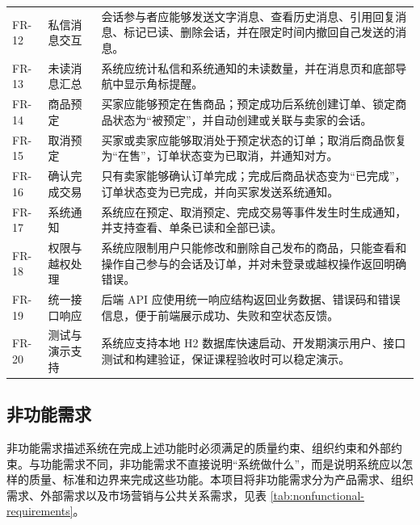 ﻿\documentclass[UTF8,a4paper,12pt]{ctexart}
\begin{document}
\begin{longtable}{p{2.2cm}p{3.6cm}p{7.8cm}}
  FR-12 & 私信消息交互 & 会话参与者应能够发送文字消息、查看历史消息、引用回复消息、标记已读、删除会话，并在限定时间内撤回自己发送的消息。 \\
  FR-13 & 未读消息汇总 & 系统应统计私信和系统通知的未读数量，并在消息页和底部导航中显示角标提醒。 \\
  FR-14 & 商品预定 & 买家应能够预定在售商品；预定成功后系统创建订单、锁定商品状态为“被预定”，并自动创建或关联与卖家的会话。 \\
  FR-15 & 取消预定 & 买家或卖家应能够取消处于预定状态的订单；取消后商品恢复为“在售”，订单状态变为已取消，并通知对方。 \\
  FR-16 & 确认完成交易 & 只有卖家能够确认订单完成；完成后商品状态变为“已完成”，订单状态变为已完成，并向买家发送系统通知。 \\
  FR-17 & 系统通知 & 系统应在预定、取消预定、完成交易等事件发生时生成通知，并支持查看、单条已读和全部已读。 \\
  FR-18 & 权限与越权处理 & 系统应限制用户只能修改和删除自己发布的商品，只能查看和操作自己参与的会话及订单，并对未登录或越权操作返回明确错误。 \\
  FR-19 & 统一接口响应 & 后端 API 应使用统一响应结构返回业务数据、错误码和错误信息，便于前端展示成功、失败和空状态反馈。 \\
  FR-20 & 测试与演示支持 & 系统应支持本地 H2 数据库快速启动、开发期演示用户、接口测试和构建验证，保证课程验收时可以稳定演示。 \\
  \bottomrule
\end{longtable}

\subsection{非功能需求}
非功能需求描述系统在完成上述功能时必须满足的质量约束、组织约束和外部约束。与功能需求不同，非功能需求不直接说明“系统做什么”，而是说明系统应以怎样的质量、标准和边界来完成这些功能。本项目将非功能需求分为产品需求、组织需求、外部需求以及市场营销与公共关系需求，见表 \ref{tab:nonfunctional-requirements}。
\end{document}
